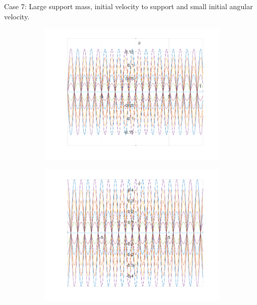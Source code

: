 \documentclass{article}
\begin{document}
	Case 7:
	Large support mass, initial velocity to support and small initial angular velocity.
	\begin{figure}[h!]
		\centering
		\begin{subfigure}[b]{0.48\linewidth}
			\includegraphics[width=\linewidth]{./SmallOscillations/S7/F1.png}
		\end{subfigure}
		\begin{subfigure}[b]{0.48\linewidth}
			\includegraphics[width=\linewidth]{./SmallOscillations/S7/F2.png}
		\end{subfigure}
	\end{figure}
	
\end{document}
